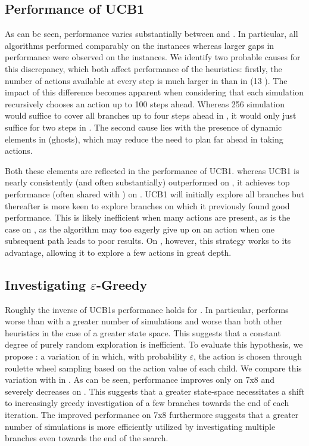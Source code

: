 \subsection{Performance of UCB1}
As can be seen, performance varies substantially between \rock and \poc. In particular, all algorithms performed comparably on the \poc instances whereas larger gaps in performance were observed on the \rock instances. We identify two probable causes for this discrepancy, which both affect performance of the heuristics: firstly, the number of actions available at every step is much larger in \rock than in \poc (13 ). The impact of this difference becomes apparent when considering that each simulation recursively chooses an action up to 100 steps ahead. Whereas 256 simulation would suffice to cover all branches up to four steps ahead in \poc, it would only just suffice for two steps in \rock. The second cause lies with the presence of dynamic elements in \poc (ghosts), which may reduce the need to plan far ahead in taking actions.

Both these elements are reflected in the performance of UCB1. whereas UCB1 is nearly consistently (and often substantially) outperformed on \rock, it achieves top performance (often shared with \soft) on \poc. UCB1 will initially explore all branches but thereafter is more keen to explore branches on which it previously found good performance. This is likely inefficient when many actions are present, as is the case on \rock, as the algorithm may too eagerly give up on an action when one subsequent path leads to poor results. On \poc, however, this strategy works to its advantage, allowing it to explore a few actions in great depth. 


\subsection{Investigating $\varepsilon$-Greedy}
Roughly the inverse of UCB1s performance holds for \egreedy. In particular, \egreedy performs worse than \soft with a greater number of simulations and worse than both other heuristics in the case of a greater state space. This suggests that a constant degree of purely random exploration is inefficient. To evaluate this hypothesis, we propose \eroulette: a variation of \egreedy in which, with probability $\varepsilon$, the action is chosen through roulette wheel sampling based on the action value of each child. We compare this variation with \soft in . As can be seen, performance improves only on \rock 7x8 and severely decreases on \poc. This suggests that a greater state-space necessitates a shift to increasingly greedy investigation of a few branches towards the end of each iteration. The improved performance on \rock 7x8 furthermore suggests that a greater number of simulations is more efficiently utilized by investigating multiple branches even towards the end of the search.

